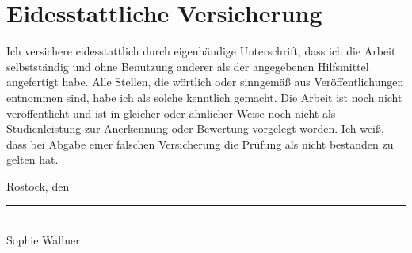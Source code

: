 \documentclass[a4paper, 11pt]{scrartcl}
\begin{document}
\newpage

\pagestyle{empty}
\section*{Eidesstattliche Versicherung}

Ich versichere eidesstattlich durch eigenhändige Unterschrift, dass ich die Arbeit selbstständig und ohne Benutzung anderer als der angegebenen Hilfsmittel angefertigt habe. Alle Stellen, die wörtlich oder sinngemäß aus Veröffentlichungen entnommen sind, habe ich als solche kenntlich gemacht. Die Arbeit ist noch nicht veröffentlicht und ist in gleicher oder ähnlicher Weise noch nicht als Studienleistung zur Anerkennung oder Bewertung vorgelegt worden. Ich weiß, dass bei Abgabe einer falschen Versicherung die Prüfung als nicht bestanden zu gelten hat.

\vspace*{1.5cm}

Rostock, den 


\vspace*{1.5cm}

\rule{0.3\textwidth}{0.4pt}\\
Sophie Wallner
\end{document}
